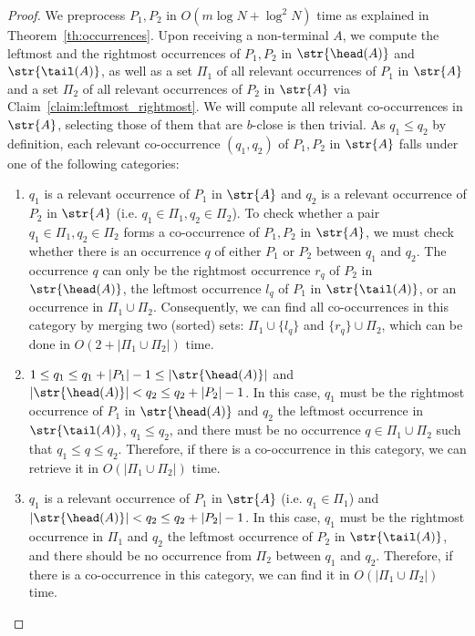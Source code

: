 \begin{proof}
    We preprocess $P_1, P_2$ in $O(m \log N + \log^2 N)$ time as explained in Theorem~\ref{th:occurrences}. Upon receiving a non-terminal $A$, we compute the leftmost and the rightmost occurrences of $P_1, P_2$ in $\str{\head(A)}$ and $\str{\tail(A)}$, as well as a set $\Pi_1$ of all relevant occurrences of $P_1$ in $\str{A}$ and a set $\Pi_2$ of all relevant occurrences of $P_2$ in $\str{A}$ via Claim~\ref{claim:leftmost_rightmost}.
    We will compute all relevant co-occurrences in $\str{A}$, selecting those of them that are $b$-close is then trivial. 
    As $q_1 \le q_2$ by definition, each relevant co-occurrence $(q_1,q_2)$ of $P_1,P_2$ in $\str{A}$ falls under one of the following categories:
    
    \begin{enumerate}
    \item $q_1$ is a relevant occurrence of $P_1$ in $\str{A}$ and $q_2$ is a relevant occurrence of $P_2$ in $\str{A}$ (i.e. $q_1 \in \Pi_1, q_2 \in \Pi_2$). To check whether a pair $q_1 \in \Pi_1, q_2 \in \Pi_2$ forms a co-occurrence of $P_1, P_2$ in $\str{A}$, we must check whether there is an occurrence $q$ of either $P_1$ or $P_2$ between $q_1$ and $q_2$. The occurrence $q$ can only be the rightmost occurrence $r_q$ of $P_2$ in $\str{\head(A)}$, the leftmost occurrence $l_q$ of $P_1$ in $\str{\tail(A)}$, or an occurrence in $\Pi_1 \cup \Pi_2$. Consequently, we can find all co-occurrences in this category by merging two (sorted) sets: $\Pi_1 \cup \{l_q\}$ and $\{r_q\} \cup \Pi_2$, which can be done in $O(2 + |\Pi_1 \cup \Pi_2|)$ time.
    
    \item $1 \le q_1  \le q_1+|P_1|-1 \le |\str{\head(A)}|$ and  $|\str{\head(A)}| < q_2 \le q_2+|P_2|-1$. In this case, $q_1$ must be the rightmost occurrence of $P_1$ in $\str{\head(A)}$ and $q_2$ the leftmost occurrence in $\str{\tail(A)}$, $q_1 \le q_2$, and there must be no occurrence $q \in \Pi_1 \cup \Pi_2$  such that $q_1 \le q \le q_2$. Therefore, if there is a co-occurrence in this category, we can retrieve it in $O(|\Pi_1 \cup \Pi_2|)$ time.
    
    \item $q_1$ is a relevant occurrence of $P_1$ in $\str{A}$ (i.e. $q_1 \in \Pi_1$) and $|\str{\head(A)}| < q_2 \le q_2+|P_2|-1$. In this case, $q_1$ must be the rightmost occurrence in $\Pi_1$ and $q_2$ the leftmost occurrence of $P_2$ in $\str{\tail(A)}$, and there should be no occurrence from $\Pi_2$ between $q_1$ and $q_2$. Therefore, if there is a co-occurrence in this category, we can find it in $O(|\Pi_1 \cup \Pi_2|)$ time.
    

\end{enumerate}
\end{proof}
